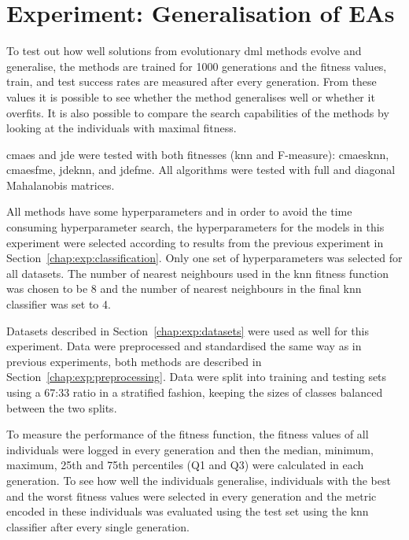 \documentclass[12pt,a4paper]{report}
\begin{document}

\section{Experiment: Generalisation of EAs} \label{chap:exp:fitness}

To test out how well solutions from evolutionary \ac{dml} methods evolve and generalise, the methods are trained for 1000 generations and the fitness values, train, and test success rates are measured after every generation. From these values it is possible to see whether the method generalises well or whether it overfits. It is also possible to compare the search capabilities of the methods by looking at the individuals with maximal fitness.

\ac{cmaes} and \ac{jde} were tested with both fitnesses (\ac{knn} and \mbox{F-measure}): \ac{cmaesknn}, \ac{cmaesfme}, \ac{jdeknn}, and \ac{jdefme}. All algorithms were tested with full and diagonal Mahalanobis matrices.

All methods have some hyperparameters and in order to avoid the time consuming hyperparameter search, the hyperparameters for the models in this experiment were selected according to results from the previous experiment in Section~\ref{chap:exp:classification}. Only one set of hyperparameters was selected for all datasets. The number of nearest neighbours used in the \ac{knn} fitness function was chosen to be 8 and the number of nearest neighbours in the final \ac{knn} classifier was set to 4.

Datasets described in Section~\ref{chap:exp:datasets} were used as well for this experiment. Data were preprocessed and standardised the same way as in previous experiments, both methods are described in Section~\ref{chap:exp:preprocessing}. Data were split into training and testing sets using a 67:33 ratio in a stratified fashion, keeping the sizes of classes balanced between the two splits.

To measure the performance of the fitness function, the fitness values of all individuals were logged in every generation and then the median, minimum, maximum, 25th and 75th percentiles (Q1 and Q3) were calculated in each generation. To see how well the individuals generalise, individuals with the best and the worst fitness values were selected in every generation and the metric encoded in these individuals was evaluated using the test set using the \ac{knn} classifier after every single generation.
\end{document}
